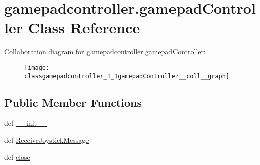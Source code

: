 \hypertarget{classgamepadcontroller_1_1gamepadController}{\section{gamepadcontroller.\-gamepad\-Controller Class Reference}
\label{classgamepadcontroller_1_1gamepadController}
}


Collaboration diagram for gamepadcontroller.\-gamepad\-Controller\-:
\nopagebreak
\begin{figure}[H]
\begin{center}
\leavevmode
\texttt{[image: classgamepadcontroller\_1\_1gamepadController\_\_coll\_\_graph]}
\end{center}
\end{figure}
\subsection*{Public Member Functions}
\begin{DoxyCompactItemize}
\item 
def \hyperlink{classgamepadcontroller_1_1gamepadController_a56dc7ac32e35bec7226c6555d168bf4b}{\-\_\-\-\_\-init\-\_\-\-\_\-}
\item 
def \hyperlink{classgamepadcontroller_1_1gamepadController_a18d44e0d49a0d7e4a515092b016464ef}{Receive\-Joystick\-Message}
\item 
def \hyperlink{classgamepadcontroller_1_1gamepadController_a9bd3d20beace00cd8381d708097bbf61}{close}
\end{DoxyCompactItemize}
